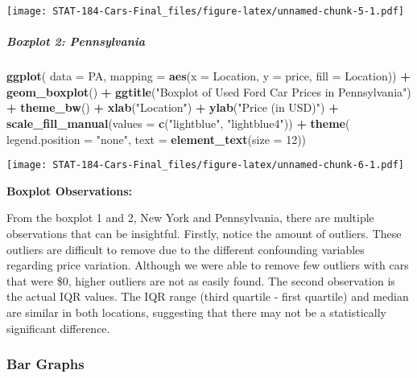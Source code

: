 \documentclass[
]{article}
\newenvironment{Shaded}{\begin{snugshade}}{\end{snugshade}}
\newcommand{\AttributeTok}[1]{\textcolor[rgb]{0.13,0.29,0.53}{#1}}
\newcommand{\DecValTok}[1]{\textcolor[rgb]{0.00,0.00,0.81}{#1}}
\newcommand{\FunctionTok}[1]{\textcolor[rgb]{0.13,0.29,0.53}{\textbf{#1}}}
\newcommand{\NormalTok}[1]{#1}
\newcommand{\SpecialCharTok}[1]{\textcolor[rgb]{0.81,0.36,0.00}{\textbf{#1}}}
\newcommand{\StringTok}[1]{\textcolor[rgb]{0.31,0.60,0.02}{#1}}
\begin{document}
\texttt{[image: STAT-184-Cars-Final\_files/figure-latex/unnamed-chunk-5-1.pdf]}

\hypertarget{boxplot-2-pennsylvania}{%
\subparagraph{Boxplot 2: Pennsylvania}\label{boxplot-2-pennsylvania}}

\begin{Shaded}
\begin{Highlighting}[]
\FunctionTok{ggplot}\NormalTok{(}
\AttributeTok{data =}\NormalTok{ PA,}
\AttributeTok{mapping =} \FunctionTok{aes}\NormalTok{(}\AttributeTok{x =}\NormalTok{ Location, }\AttributeTok{y =}\NormalTok{ price, }\AttributeTok{fill =}\NormalTok{ Location)) }\SpecialCharTok{+}
  \FunctionTok{geom\_boxplot}\NormalTok{() }\SpecialCharTok{+}
  \FunctionTok{ggtitle}\NormalTok{(}\StringTok{"Boxplot of Used Ford Car Prices in Pennsylvania"}\NormalTok{) }\SpecialCharTok{+}
  \FunctionTok{theme\_bw}\NormalTok{() }\SpecialCharTok{+}
  \FunctionTok{xlab}\NormalTok{(}\StringTok{"Location"}\NormalTok{) }\SpecialCharTok{+}
  \FunctionTok{ylab}\NormalTok{(}\StringTok{"Price (in USD)"}\NormalTok{) }\SpecialCharTok{+}
  \FunctionTok{scale\_fill\_manual}\NormalTok{(}\AttributeTok{values =} \FunctionTok{c}\NormalTok{(}\StringTok{"lightblue"}\NormalTok{, }\StringTok{"lightblue4"}\NormalTok{)) }\SpecialCharTok{+}
  \FunctionTok{theme}\NormalTok{(}
  \AttributeTok{legend.position =} \StringTok{"none"}\NormalTok{,}
  \AttributeTok{text =} \FunctionTok{element\_text}\NormalTok{(}\AttributeTok{size =} \DecValTok{12}\NormalTok{))}
\end{Highlighting}
\end{Shaded}

\texttt{[image: STAT-184-Cars-Final\_files/figure-latex/unnamed-chunk-6-1.pdf]}

\textbf{Boxplot Observations:}

From the boxplot 1 and 2, New York and Pennsylvania, there are multiple
observations that can be insightful. Firstly, notice the amount of
outliers. These outliers are difficult to remove due to the different
confounding variables regarding price variation. Although we were able
to remove few outliers with cars that were \$0, higher outliers are not
as easily found. The second observation is the actual IQR values. The
IQR range (third quartile - first quartile) and median are similar in
both locations, suggesting that there may not be a statistically
significant difference.

\hypertarget{bar-graphs}{%
\subsubsection{\texorpdfstring{\textbf{Bar
Graphs}}{Bar Graphs}}\label{bar-graphs}}
\end{document}
